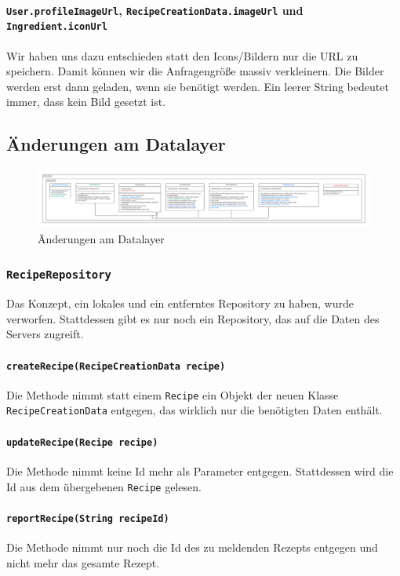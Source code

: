 \documentclass{implementierungsheft}
\begin{document}
\paragraph{\texttt{User.profileImageUrl}, \texttt{RecipeCreationData.imageUrl} und \texttt{Ingredient.iconUrl}} Wir haben uns dazu entschieden statt den Icons/Bildern nur die URL zu speichern. Damit können wir die Anfragengröße massiv verkleinern. Die Bilder werden erst dann geladen, wenn sie benötigt werden. Ein leerer String bedeutet immer, dass kein Bild gesetzt ist.
\newpage
\subsection{Änderungen am Datalayer}
\begin{figure}[htp]
    \centering
    \includegraphics[width=\textwidth]{images/uml/dataLayer.pdf}
    \caption{Änderungen am Datalayer}
    \label{fig:dataLayer}
\end{figure}
\subsubsection{\texttt{RecipeRepository}}
Das Konzept, ein lokales und ein entferntes Repository zu haben, wurde verworfen. Stattdessen gibt es nur noch ein Repository, das auf die Daten des Servers zugreift.
\paragraph{\texttt{createRecipe(RecipeCreationData recipe)}} Die Methode nimmt statt einem \texttt{Recipe} ein Objekt der neuen Klasse \texttt{RecipeCreationData} entgegen, das wirklich nur die benötigten Daten enthält.
\paragraph{\texttt{updateRecipe(Recipe recipe)}} Die Methode nimmt keine Id mehr als Parameter entgegen. Stattdessen wird die Id aus dem übergebenen \texttt{Recipe} gelesen.
\paragraph{\texttt{reportRecipe(String recipeId)}} Die Methode nimmt nur noch die Id des zu meldenden Rezepts entgegen und nicht mehr das gesamte Rezept.
\end{document}
